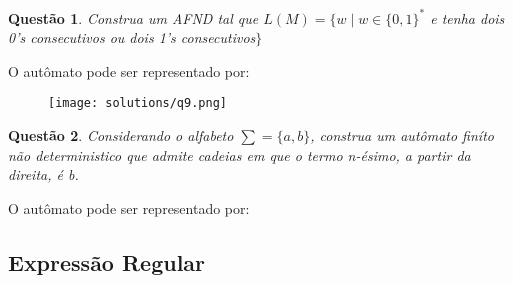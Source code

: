 \documentclass{article}
\newtheorem{problem}{Questão}
\begin{document}
     \begin{problem}
        Construa um AFND tal que $L(M) = \{ w \mid w \in \{0,1\}^*
        $ e tenha dois 0’s
        consecutivos ou dois 1’s consecutivos$\}$
    \end{problem}
    
    \begin{solution} O autômato pode ser representado por:
          \begin{figure}[H]
                \centering
                \texttt{[image: solutions/q9.png]}
            \end{figure}
    \end{solution}
    
    \begin{problem}
        Considerando o alfabeto $\sum = \{ a, b\}$, construa um autômato finíto não deterministico que admite cadeias em que o termo n-ésimo, a partir da direita, é b.
    \end{problem}
    
    \begin{solution} O autômato pode ser representado por:
          
    \end{solution}
    
    
    \subsection{Expressão Regular}
    
\end{document}
